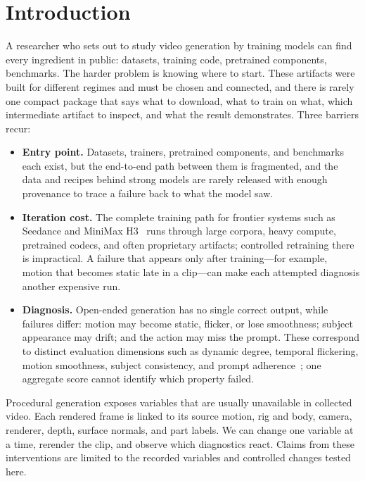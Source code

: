 \documentclass[10pt,twocolumn]{article}
\begin{document}
\section{Introduction}
A researcher who sets out to study video generation by training models can find every ingredient in public:
datasets, training code, pretrained components, benchmarks. The harder problem is knowing where to start.
These artifacts were built for different regimes and must be chosen and connected, and there is rarely one
compact package that says what to download, what to train on what, which intermediate artifact to inspect,
and what the result demonstrates. Three barriers recur:
\begin{itemize}[leftmargin=*,nosep]
\item \textbf{Entry point.} Datasets, trainers, pretrained components, and benchmarks each exist, but the
end-to-end path between them is fragmented, and the data and recipes behind strong models are rarely released
with enough provenance to trace a failure back to what the model saw.
\item \textbf{Iteration cost.} The complete training path for frontier systems such as Seedance and MiniMax
H3~\cite{gao2025seedance,minimax2026h3} runs through large corpora, heavy compute, pretrained codecs, and often
proprietary artifacts; controlled retraining there is impractical. A failure that appears only after
training---for example, motion that becomes static late in a clip---can make each attempted diagnosis
another expensive run.
\item \textbf{Diagnosis.} Open-ended generation has no single correct output, while failures differ: motion
may become static, flicker, or lose smoothness; subject appearance may drift; and the action may miss the
prompt. These correspond to distinct evaluation dimensions such as dynamic degree, temporal flickering,
motion smoothness, subject consistency, and prompt adherence~\cite{huang2023vbench}; one aggregate score
cannot identify which property failed.
\end{itemize}

Procedural generation exposes variables that are usually unavailable in collected video. Each rendered frame
is linked to its source motion, rig and body, camera, renderer, depth, surface normals, and part labels. We
can change one variable at a time, rerender the clip, and observe which diagnostics react. Claims from
these interventions are limited to the recorded variables and controlled changes tested here.
\end{document}
